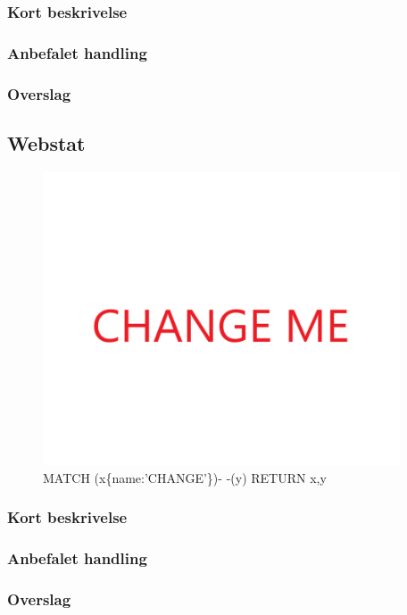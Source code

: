 \documentclass{article}
\begin{document}
\subsubsection{Kort beskrivelse}
\subsubsection{Anbefalet handling}
\subsubsection{Overslag}


\subsection{Webstat}
\begin{figure}[h]
\includegraphics[width=300pt]{CHANGE.PNG}
\caption{MATCH (x\{name:'CHANGE'\})- -(y) RETURN x,y}
\end{figure}
\subsubsection{Kort beskrivelse}
\subsubsection{Anbefalet handling}
\subsubsection{Overslag}
\end{document}
